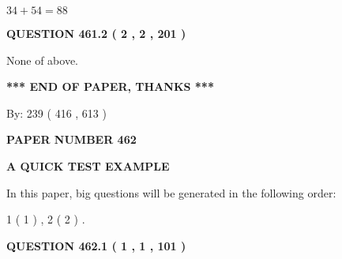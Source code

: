 \documentclass[12pt]{article}
\begin{document}
$ %
34 +  %
54=   %
88$
 
 
  
\vspace{0.2in}
  
{\textbf{\Large{QUESTION
461.2 
 ( 2 , 2 , 201 )
}}}
  
  
 
 
\noindent{}
 
 
 None of above.
 
 
 
 
   
   
 \vspace{0.2in}
 
   
   
   
   
\vspace{1.0in} 
{\textbf{\large{ *** END OF PAPER, THANKS *** }}} 
   
   
\hspace{1.0in} By: 
 239 ( 416 ,  613 )
   
   
   
   
\newpage 
\setcounter{page}{ 
   462001 } 
   
   
   
   
 {\textbf{ \Large{ PAPER NUMBER  462  }}}
   
   
\vspace{0.2in}
   
   
   
   
   
   
 \vspace{0.2in}
{\LARGE {\textbf{ A QUICK TEST EXAMPLE}}}
   
   
   
\vspace{0.2in}
   
In this paper, big questions will be generated in the following order: 
   
   
   1 ( 1 )
 ,
   2 ( 2 )
 .
  
\vspace{0.2in}
  
{\textbf{\Large{QUESTION
462.1 
 ( 1 , 1 , 101 )
}}}
  
  
 
 
\noindent{}
\end{document}
